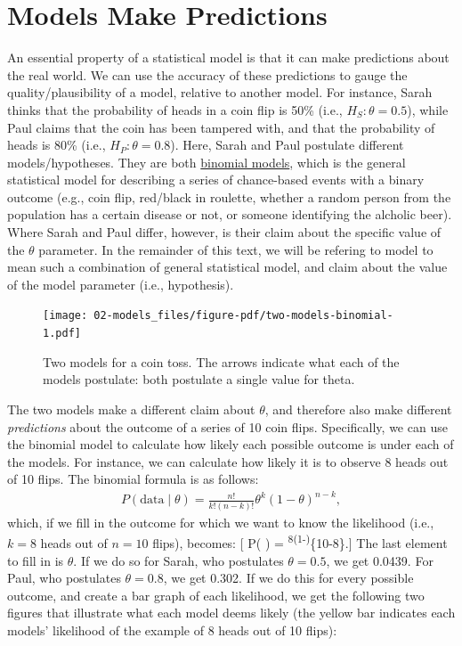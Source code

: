 \documentclass[
  letterpaper,
  DIV=11,
  numbers=noendperiod]{scrreprt}
\begin{document}
\hypertarget{models-make-predictions}{%
\section{Models Make Predictions}\label{models-make-predictions}}

An essential property of a statistical model is that it can make
predictions about the real world. We can use the accuracy of these
predictions to gauge the quality/plausibility of a model, relative to
another model. For instance, Sarah thinks that the probability of heads
in a coin flip is 50\% (i.e., \(H_S: \theta = 0.5\)), while Paul claims
that the coin has been tampered with, and that the probability of heads
is 80\% (i.e., \(H_P: \theta = 0.8\)). Here, Sarah and Paul postulate
different models/hypotheses. They are both
\href{https://en.wikipedia.org/wiki/Binomial_distribution}{binomial
models}, which is the general statistical model for describing a series
of chance-based events with a binary outcome (e.g., coin flip, red/black
in roulette, whether a random person from the population has a certain
disease or not, or someone identifying the alcholic beer). Where Sarah
and Paul differ, however, is their claim about the specific value of the
\(\theta\) parameter. In the remainder of this text, we will be refering
to model to mean such a combination of general statistical model, and
claim about the value of the model parameter (i.e., hypothesis).

\begin{figure}

{\centering \texttt{[image: 02-models\_files/figure-pdf/two-models-binomial-1.pdf]}

}

\caption{Two models for a coin toss. The arrows indicate what each of
the models postulate: both postulate a single value for theta.}

\end{figure}

The two models make a different claim about \(\theta\), and therefore
also make different \emph{predictions} about the outcome of a series of
10 coin flips. Specifically, we can use the binomial model to calculate
how likely each possible outcome is under each of the models. For
instance, we can calculate how likely it is to observe 8 heads out of 10
flips. The binomial formula is as follows: \begin{align} 
\label{binomFormula}
P(\text{data} \mid \theta) = \frac{n!}{k! (n-k)!} \theta^k\left(1-\theta\right)^{n-k},
\end{align} which, if we fill in the outcome for which we want to know
the likelihood (i.e., \(k=8\) heads out of \(n=10\) flips), becomes: {[}
P( \mid \theta) = 
\theta\textsuperscript{8\left(1-\theta\right)}\{10-8\}.{]} The last
element to fill in is \(\theta\). If we do so for Sarah, who postulates
\(\theta = 0.5\), we get 0.0439. For Paul, who postulates
\(\theta = 0.8\), we get 0.302. If we do this for every possible
outcome, and create a bar graph of each likelihood, we get the following
two figures that illustrate what each model deems likely (the yellow bar
indicates each models' likelihood of the example of 8 heads out of 10
flips):
\end{document}
